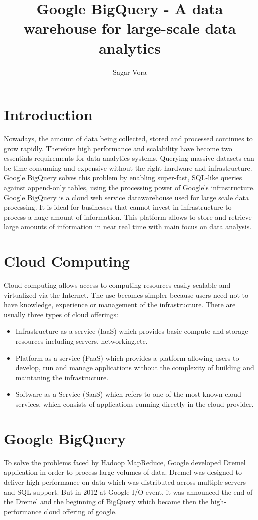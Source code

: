 \documentclass[9pt,twocolumn,twoside]{../../styles/osajnl}
\title{Google BigQuery - A data warehouse for large-scale data analytics}
\author[1]{Sagar Vora}
\affil[1]{School of Informatics and Computing, Bloomington, IN 47408, U.S.A.}
\begin{document}
\maketitle

\section{Introduction}
Nowadays, the amount of data being collected, stored and processed
continues to grow rapidly. Therefore high performance and scalability
have become two essentials requirements for data analytics
systems. Querying massive datasets can be time consuming and expensive
without the right hardware and infrastructure. Google BigQuery solves
this problem by enabling super-fast, SQL-like queries against
append-only tables, using the processing power of Google's
infrastructure. Google BigQuery \cite{www-bigquery}
\cite{bigquery-paper} is a cloud web service datawarehouse used for
large scale data processing. It is ideal for businesses that cannot
invest in infrastructure to process a huge amount of information. This
platform allows to store and retrieve large amounts of information in
near real time with main focus on data analysis.

\section{Cloud Computing}
Cloud computing \cite{www-cloudcomputing}
\cite{benchmark-for-cloud-paper} allows access to computing resources
easily scalable and virtualized via the Internet. The use becomes
simpler because users need not to have knowledge, experience or
management of the infrastructure. There are usually three types of
cloud offerings:\begin{itemize} \item Infrastructure as a service
  (IaaS) which provides basic compute and storage resources including
  servers, networking,etc. \item Platform as a service (PaaS) which
  provides a platform allowing users to develop, run and manage
  applications without the complexity of building and maintaning the
  infrastructure. \item Software as a Service (SaaS) which refers to
  one of the most known cloud services, which consists of applications
  running directly in the cloud provider. \end{itemize}

\noindent

\section{Google BigQuery}
To solve the problems faced by Hadoop\cite{www-apache-hadoop}
MapReduce\cite{mapreduce-article}, Google developed Dremel
application in order to process large volumes of data. Dremel was
designed to deliver high performance on data which was distributed
across multiple servers and SQL support. But in 2012 at Google I/O
event, it was announced the end of the Dremel and the beginning of
BigQuery which became then the high-performance cloud offering of
google.
\end{document}

